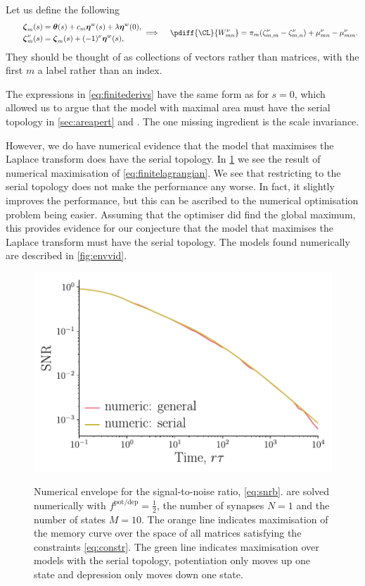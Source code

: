 \documentclass[12pt]{article}
\newcommand{\eqm}{\pi}
\newcommand{\etw}{\boldsymbol{\eta}^w}
\newcommand{\thbm}{\theta}
\newcommand{\thb}{\boldsymbol{\thbm}}
\newcommand{\dgnm}{\zeta}
\newcommand{\dgn}{\boldsymbol{\dgnm}}
\newcommand{\Wm}{W}
\newcommand{\kktm}{\mu}
\newcommand{\potdep}{^{\text{pot/dep}}}
\begin{document}
Let us define the following
%
\begin{equation}\label{eq:dgndef}
\begin{aligned}
    \dgn_{m}(s) &= \thb(s) + c_m \etw(s) + \lambda \etw(0), \\
    \qquad
    \dgn^\nu_m(s) &= \dgn_m(s) + (-1)^\nu \etw(s),   
\end{aligned}
  \implies \quad
  \pdiff{\CL}{\Wm^\nu_{mn}} = \eqm_m (\dgnm^\nu_{m,m} - \dgnm^\nu_{m,n}) + \kktm^\nu_{mn} - \kktm^\nu_{mm}.
\end{equation}
%
They should be thought of as collections of vectors rather than matrices, with the first \(m\) a label rather than an index.

The expressions in \cref{eq:finitederivs} have the same form as for \(s=0\), which allowed us to argue that the model with maximal area must have the serial topology in \cref{sec:areapert} and \cite{Lahiri2013synapse}.
The one missing ingredient is the scale invariance.

However, we do have numerical evidence that the model that maximises the Laplace transform does have the serial topology.
In \cref{fig:envnum} we see the result of numerical maximisation of \cref{eq:finitelagrangian}.
We see that restricting to the serial topology does not make the performance any worse.
In fact, it slightly improves the performance, but this can be ascribed to the numerical optimisation problem being easier.
Assuming that the optimiser did find the global maximum, this provides evidence for our conjecture that the model that maximises the Laplace transform must have the serial topology.
The models found numerically are described in \cref{fig:envvid}.

\begin{figure}[tb]
  \centering
  \includegraphics[width=0.8\linewidth]{LenvNumOnly.pdf}\\
  \caption[Numerical envelope for the signal-to-noise ratio]
  {Numerical envelope for the signal-to-noise ratio, \eqref{eq:snrb}. 
   are solved numerically with \(f\potdep=\frac{1}{2}\), the number of synapses \(N=1\) and the number of states \(M=10\).
  The orange line indicates maximisation of the memory curve over the space of all matrices satisfying the constraints \eqref{eq:constr}.
  The green line indicates maximisation over models with the serial topology, \ie potentiation only moves up one state and depression only moves down one state.
  }\label{fig:envnum}
\end{figure}
\end{document}
